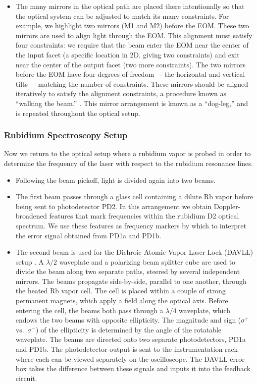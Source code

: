 \documentclass{../lab}
\begin{document}
\begin{itemize}
    \item The many mirrors in the optical path are placed there intentionally so that the optical system can be adjusted to match its many constraints. For example, we highlight two mirrors (M1 and M2) before the EOM. These two mirrors are used to align light through the EOM. This alignment must satisfy four constraints: we require that the beam enter the EOM near the center of the input facet (a specific location in 2D, giving two constraints) and exit near the center of the output facet (two more constraints). The two mirrors before the EOM have four degrees of freedom –- the horizontal and vertical tilts -– matching the number of constraints. These mirrors should be aligned iteratively to satisfy the alignment constraints, a procedure known as ``walking the beam.'' \cite{SUNYStonyBrook}. This mirror arrangement is known as a ``dog-leg,'' and is repeated throughout the optical setup.
\end{itemize}

\subsubsection{Rubidium Spectroscopy Setup}

Now we return to the optical setup where a rubidium vapor is probed in order to determine the frequency of the laser with respect to the rubidium resonance lines.

\begin{itemize}
    \item Following the beam pickoff, light is divided again into two beams.

    \item The first beam passes through a glass cell containing a dilute Rb vapor before being sent to photodetector PD2. In this arrangement we obtain Doppler-broadened features that mark frequencies within the rubidium D2 optical spectrum.  We use these features as frequency markers by which to interpret the error signal obtained from PD1a and PD1b.

    \item The second beam is used for the Dichroic Atomic Vapor Laser Lock (DAVLL) setup \cite{Corwin}.  A $\lambda/2$ waveplate and a polarizing beam splitter cube are used to divide the beam along two separate paths, steered by several independent mirrors.  The beams propagate side-by-side, parallel to one another, through the heated Rb vapor cell.  The cell is placed within a couple of strong permanent magnets, which apply a field along the optical axis.  Before entering the cell, the beams both pass through a $\lambda/4$ waveplate, which endows the two beams with opposite ellipticity.  The magnitude and sign ($\sigma^+$ vs.\ $\sigma^-$) of the ellipticity is determined by the angle of the rotatable waveplate.  The beams are directed onto two separate photodetectors, PD1a and PD1b.  The photodetector output is sent to the instrumentation rack where each can be viewed separately on the oscilloscope.  The DAVLL error box takes the difference between these signals and inputs it into the feedback circuit.
\end{itemize}
\end{document}
